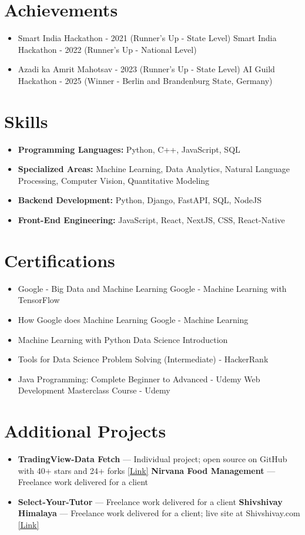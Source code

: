\documentclass[a4paper,10pt]{article}
\begin{document}
\section*{Achievements}
\begin{itemize}
\item Smart India Hackathon - 2021 (Runner's Up - State Level) \hfill Smart India Hackathon - 2022 (Runner's Up - National Level)
\item Azadi ka Amrit Mahotsav - 2023 (Runner's Up - State Level) \hfill AI Guild Hackathon - 2025 (Winner - Berlin and Brandenburg State, Germany)
\end{itemize}

\section*{Skills}
\begin{itemize}
  \item \textbf{Programming Languages:} Python, C++, JavaScript, SQL
  \item \textbf{Specialized Areas:} Machine Learning, Data Analytics, Natural Language Processing, Computer Vision, Quantitative Modeling
  \item \textbf{Backend Development:} Python, Django, FastAPI, SQL, NodeJS
  \item \textbf{Front-End Engineering:} JavaScript, React, NextJS, CSS, React-Native
\end{itemize}

\section*{Certifications}
\begin{itemize}
\item Google - Big Data and Machine Learning \hfill Google - Machine Learning with TensorFlow
\item How Google does Machine Learning \hfill Google - Machine Learning
\item Machine Learning with Python \hfill Data Science Introduction
\item Tools for Data Science \hfill Problem Solving (Intermediate) - HackerRank
\item Java Programming: Complete Beginner to Advanced - Udemy \hfill Web Development Masterclass Course - Udemy
\end{itemize}

\section*{Additional Projects}
\begin{itemize}
\item \textbf{TradingView-Data Fetch} — Individual project; open source on GitHub with 40+ stars and 24+ forks \href{https://github.com/ravalmeet/TradingView}{[Link]} \hfill \textbf{Nirvana Food Management} — Freelance work delivered for a client
\item \textbf{Select-Your-Tutor} — Freelance work delivered for a client \hfill \textbf{Shivshivay Himalaya} — Freelance work delivered for a client; live site at Shivshivay.com \href{Shivshivay.com}{[Link]}
\end{itemize}
\end{document}
